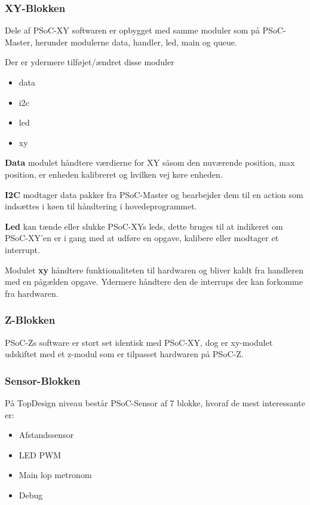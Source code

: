 \subsubsection{XY-Blokken}

Dele af PSoC-XY softwaren er opbygget med samme moduler som på PSoC-Master, herunder modulerne data, handler, led, main og queue.

Der er ydermere tilføjet/ændret disse moduler
\begin{itemize}
    \item data
    \item i2c
    \item led
    \item xy
\end{itemize}

\textbf{Data} modulet håndtere værdierne for XY såsom den nuværende position, max position, er enheden kalibreret og hvilken vej køre enheden.

\textbf{I2C} modtager data pakker fra PSoC-Master og bearbejder dem til en action som indsættes i køen til håndtering i hovedeprogrammet.

\textbf{Led} kan tænde eller slukke PSoC-XYs leds, dette bruges til at indikeret om PSoC-XY'en er i gang med at udføre en opgave, kalibere eller modtager et interrupt.

Modulet \textbf{xy} håndtere funktionaliteten til hardwaren og bliver kaldt fra handleren med en pågælden opgave. Ydermere håndtere den de interrups der kan forkomme fra hardwaren. 



\subsubsection{Z-Blokken}

PSoC-Zs software er stort set identisk med PSoC-XY, dog er xy-modulet udskiftet med et z-modul som er tilpasset hardwaren på PSoC-Z.


\subsubsection{Sensor-Blokken}

På TopDesign niveau består PSoC-Sensor af 7 blokke, hvoraf de mest interessante er:

\begin{itemize}
	\item Afstandssensor
	\item LED PWM
	\item Main lop metronom
	\item Debug
\end{itemize}

